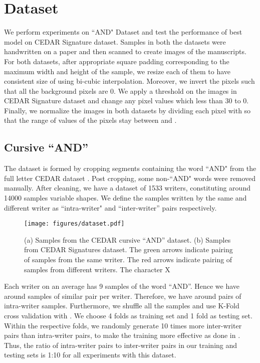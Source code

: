 \documentclass[a4paper,conference]{IEEEtran}
\begin{document}
\section{Dataset}
We perform experiments on ``AND" Dataset \cite{srihari_individuality_2001, chauhan_explanation_2019} and test the performance of best model on CEDAR Signature \cite{signature_verif_dataset} dataset. Samples in both the datasets were handwritten on a paper and then scanned to create images of the manuscripts. For both datasets, after appropriate square padding corresponding to the maximum width and height of the sample, we resize each of them to have consistent size of   using bi-cubic interpolation. Moreover, we invert the pixels such that all the background pixels are 0. We apply a threshold on the images in CEDAR Signature dataset and change any pixel values which less than 30 to 0. Finally, we normalize the images in both datasets by dividing each pixel with  so that the range of values of the pixels stay between  and .
\subsection{Cursive ``AND''}
The dataset is formed by cropping segments containing the word ``AND" from the full letter CEDAR dataset \cite{srihari_individuality_2001}. Post cropping, some non-``AND" words were removed manually. After cleaning, we have a dataset of 1533 writers, constituting around 14000 samples variable shapes.
\newline \indent We define the samples written by the same and different writer as ``intra-writer" and ``inter-writer'' pairs respectively.
\begin{figure}[!h]
\begin{center}
\texttt{[image: figures/dataset.pdf]}
\caption{\label{fig:dataset} (a) Samples from the CEDAR cursive ``AND'' dataset. (b) Samples from CEDAR Signatures dataset. The green arrows indicate pairing of samples from the same writer. The red arrows indicate pairing of samples from different writers. The character X } 
\end{center}
\end{figure}
\newline \indent Each writer on an average has 9 samples of the word ``AND''. Hence we have around  samples of similar pair per writer. Therefore, we have around  pairs of intra-writer samples. Furthermore, we shuffle all the samples and use K-Fold cross validation \cite{k_fold_95} with . We choose 4 folds as training set and 1 fold as testing set. Within the respective folds, we randomly generate 10 times more inter-writer pairs than intra-writer pairs, to make the training more effective as done in  \cite{kurczab_influence_2014}. Thus, the ratio of intra-writer pairs to inter-writer pairs in our training and testing sets is 1:10 for all experiments with this dataset.
\end{document}
